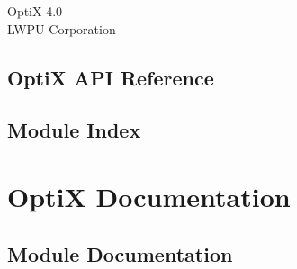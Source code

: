 \newcommand{\clearemptydoublepage}{%
  \newpage{\pagestyle{empty}\cleardoublepage}%
}





\hypersetup{pageanchor=false}
\begin{titlepage}
\vspace*{7cm}
\begin{center}%
{\Large OptiX 4.0}\\
\vspace*{1cm}
{\large LWPU Corporation}\\
\end{center}
\end{titlepage}
\clearemptydoublepage
{}
\hypersetup{pageanchor=true}

\chapter{Opti\-X A\-P\-I Reference}
\label{index}\hypertarget{index}{}
\chapter{Module Index}

\part{OptiX Documentation}
\chapter{Module Documentation}
























